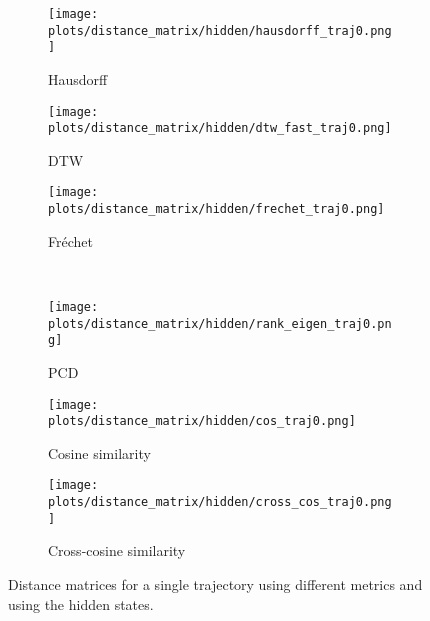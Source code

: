\documentclass[a4paper,12pt]{article}
\begin{document}
\begin{figure}[H]
    \centering
    \begin{subfigure}[b]{0.32\textwidth}
        \centering
        \texttt{[image: plots/distance\_matrix/hidden/hausdorff\_traj0.png]}
        \caption{Hausdorff}
    \end{subfigure}
    \begin{subfigure}[b]{0.32\textwidth}
        \centering
        \texttt{[image: plots/distance\_matrix/hidden/dtw\_fast\_traj0.png]}
        \caption{DTW}
    \end{subfigure}
    \begin{subfigure}[b]{0.32\textwidth}
        \centering
        \texttt{[image: plots/distance\_matrix/hidden/frechet\_traj0.png]}
        \caption{Fréchet}
    \end{subfigure}
    \\[0.5em]
    \begin{subfigure}[b]{0.32\textwidth}
        \centering
        \texttt{[image: plots/distance\_matrix/hidden/rank\_eigen\_traj0.png]}
        \caption{PCD}
    \end{subfigure}
    \begin{subfigure}[b]{0.32\textwidth}
        \centering
        \texttt{[image: plots/distance\_matrix/hidden/cos\_traj0.png]}
        \caption{Cosine similarity}
    \end{subfigure}
    \begin{subfigure}[b]{0.32\textwidth}
        \centering
        \texttt{[image: plots/distance\_matrix/hidden/cross\_cos\_traj0.png]}
        \caption{Cross-cosine similarity}
    \end{subfigure}
    \caption{Distance matrices for a single trajectory using different metrics and using the hidden states.}
    \label{fig:distance_metrics_comparison_hidden}
\end{figure}
\end{document}
